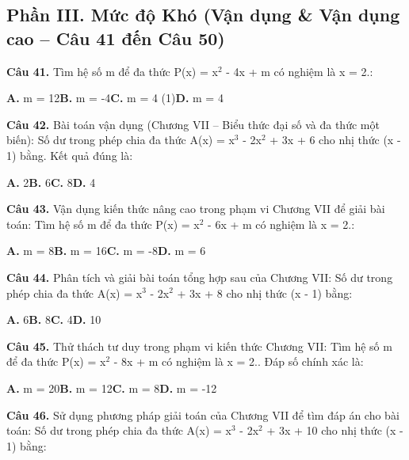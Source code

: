 \documentclass[11pt,a4paper]{article}
\begin{document}
\subsection*{\color{accent} Phần III. Mức độ Khó (Vận dụng \& Vận dụng cao -- Câu 41 đến Câu 50)}
\textbf{\color{primary} Câu 41.} Tìm hệ số m để đa thức P(x) = x$^2$ - 4x + m có nghiệm là x = 2.:\par
\hspace*{1.5em}\textbf{A.} m = 12\quad\quad \textbf{B.} m = -4\quad\quad \textbf{C.} m = 4 (1)\quad\quad \textbf{D.} m = 4\par\vspace{2pt}
\textbf{\color{primary} Câu 42.} Bài toán vận dụng (Chương VII – Biểu thức đại số và đa thức một biến): Số dư trong phép chia đa thức A(x) = x$^3$ - 2x$^2$ + 3x + 6 cho nhị thức (x - 1) bằng. Kết quả đúng là:\par
\hspace*{1.5em}\textbf{A.} 2\quad\quad \textbf{B.} 6\quad\quad \textbf{C.} 8\quad\quad \textbf{D.} 4\par\vspace{2pt}
\textbf{\color{primary} Câu 43.} Vận dụng kiến thức nâng cao trong phạm vi Chương VII để giải bài toán: Tìm hệ số m để đa thức P(x) = x$^2$ - 6x + m có nghiệm là x = 2.:\par
\hspace*{1.5em}\textbf{A.} m = 8\quad\quad \textbf{B.} m = 16\quad\quad \textbf{C.} m = -8\quad\quad \textbf{D.} m = 6\par\vspace{2pt}
\textbf{\color{primary} Câu 44.} Phân tích và giải bài toán tổng hợp sau của Chương VII: Số dư trong phép chia đa thức A(x) = x$^3$ - 2x$^2$ + 3x + 8 cho nhị thức (x - 1) bằng:\par
\hspace*{1.5em}\textbf{A.} 6\quad\quad \textbf{B.} 8\quad\quad \textbf{C.} 4\quad\quad \textbf{D.} 10\par\vspace{2pt}
\textbf{\color{primary} Câu 45.} Thử thách tư duy trong phạm vi kiến thức Chương VII: Tìm hệ số m để đa thức P(x) = x$^2$ - 8x + m có nghiệm là x = 2.. Đáp số chính xác là:\par
\hspace*{1.5em}\textbf{A.} m = 20\quad\quad \textbf{B.} m = 12\quad\quad \textbf{C.} m = 8\quad\quad \textbf{D.} m = -12\par\vspace{2pt}
\textbf{\color{primary} Câu 46.} Sử dụng phương pháp giải toán của Chương VII để tìm đáp án cho bài toán: Số dư trong phép chia đa thức A(x) = x$^3$ - 2x$^2$ + 3x + 10 cho nhị thức (x - 1) bằng:\par
\end{document}
